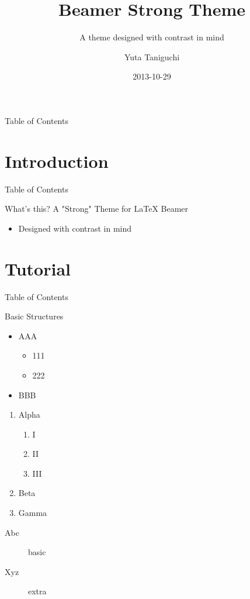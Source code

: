 \documentclass[14pt,t,hyperref={pdfencoding=auto}]{beamer}
\title{Beamer Strong Theme}
\subtitle{A theme designed with contrast in mind}
\author{Yuta Taniguchi}
\institute{@yuttieyuttie}
\date{2013-10-29}
\begin{document}
{
  \frame{\titlepage}
}
\setcounter{framenumber}{0}


\begin{frame}{Table of Contents}
  \toc
\end{frame}


\section{Introduction}
\begin{frame}{Table of Contents}
  \toc[currentsection]
\end{frame}


\begin{frame}{What's this?}
  A "Strong" Theme for LaTeX Beamer
  \begin{itemize}
  \item Designed with contrast in mind
  \end{itemize}
\end{frame}


\section{Tutorial}
\begin{frame}{Table of Contents}
  \toc[currentsection]
\end{frame}


\begin{frame}{Basic Structures}
  \begin{itemize}
  \item AAA
    \begin{itemize}
    \item 111
    \item 222
    \end{itemize}
  \item BBB
  \end{itemize}
  \begin{enumerate}
  \item Alpha
    \begin{enumerate}
    \item I
    \item II
    \item III
    \end{enumerate}
  \item Beta
  \item Gamma
  \end{enumerate}
  \begin{description}
  \item[Abc] basic
  \item[Xyz] extra
  \end{description}
\end{frame}
\end{document}
